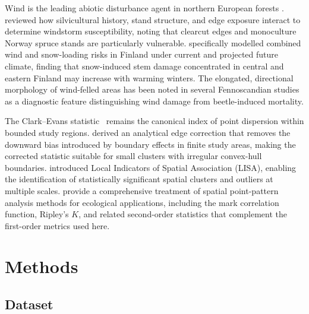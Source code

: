 \documentclass[twocolumn]{article}
\begin{document}
Wind is the leading abiotic disturbance agent in northern European forests
\citep{schelhaas2003natural}. \citet{gardiner2013wind} reviewed how silvicultural history,
stand structure, and edge exposure interact to determine windstorm susceptibility, noting that
clearcut edges and monoculture Norway spruce stands are particularly vulnerable.
\citet{gregow2011combined} specifically modelled combined wind and snow-loading risks in
Finland under current and projected future climate, finding that snow-induced stem damage
concentrated in central and eastern Finland may increase with warming winters. The elongated,
directional morphology of wind-felled areas has been noted in several Fennoscandian studies
as a diagnostic feature distinguishing wind damage from beetle-induced mortality.

The Clark--Evans statistic~\citep{clarkevans1954} remains the canonical index of point
dispersion within bounded study regions. \citet{donnelly1978} derived an analytical edge
correction that removes the downward bias introduced by boundary effects in finite study
areas, making the corrected statistic suitable for small clusters with irregular convex-hull
boundaries. \citet{anselin1995local} introduced Local Indicators of Spatial Association
(LISA), enabling the identification of statistically significant spatial clusters and outliers
at multiple scales. \citet{wiegand2014handbook} provide a comprehensive treatment of
spatial point-pattern analysis methods for ecological applications, including the mark
correlation function, Ripley's $K$, and related second-order statistics that complement
the first-order metrics used here.

\section{Methods}
\label{sec:methods}

\subsection{Dataset}
\label{sec:data}
\end{document}
